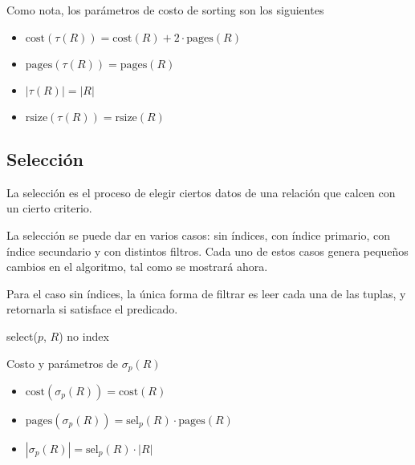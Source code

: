 Como nota, los parámetros de costo de sorting son los siguientes
\begin{itemize}
  \item $\text{cost}(\tau(R)) = \text{cost}(R) + 2 \cdot \text{pages}(R)$
  \item $\text{pages}(\tau(R)) = \text{pages}(R)$
  \item $|\tau(R)| = |R|$
  \item $\text{rsize}(\tau(R)) = \text{rsize}(R)$
\end{itemize}
\pagebreak

\subsection{Selección}
La selección es el proceso de elegir ciertos datos de una relación que calcen con un cierto criterio.

La selección se puede dar en varios casos: sin índices, con índice primario, con índice secundario y con distintos filtros. Cada uno de estos casos genera pequeños cambios en el algoritmo, tal como se mostrará ahora.

Para el caso sin índices, la única forma de filtrar es leer cada una de las tuplas, y retornarla si satisface el predicado.
\begin{paracol}{2}
  \begin{algorithm}
    \caption{select($p$, $R$) no index}
    \DontPrintSemicolon
  
  
  \end{algorithm}

  \switchcolumn

  Costo y parámetros de $\sigma_p(R)$
  \begin{itemize}
    \item $\text{cost}(\sigma_p(R)) = \text{cost}(R)$
    \item $\text{pages}(\sigma_p(R)) = \text{sel}_p(R) \cdot \text{pages}(R)$
    \item $|\sigma_p(R)| = \text{sel}_p(R) \cdot |R|$
  \end{itemize}
\end{paracol}


